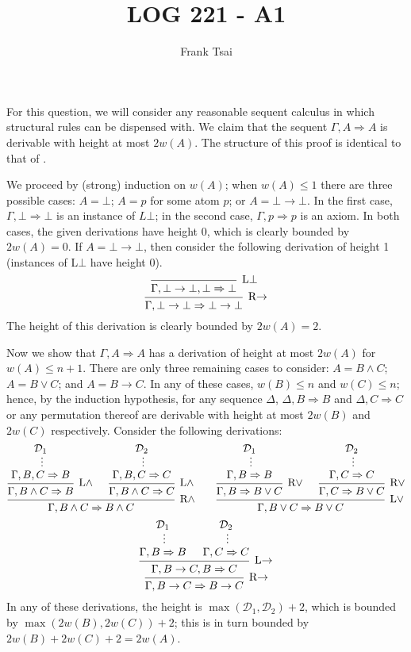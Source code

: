 \documentclass[a4paper]{article}
\title{LOG 221 - A1}
\author{Frank Tsai}
\newcommand{\seqarr}{\Rightarrow}
\newcommand{\cD}{\mathcal{D}}
\begin{document}
\maketitle

\section{}
For this question, we will consider any reasonable sequent calculus in which structural rules can be dispensed with.
We claim that the sequent $\Gamma,A \seqarr A$ is derivable with height at most $2w(A)$.
The structure of this proof is identical to that of \cite[Lemma 2.3.3]{Negri2001}.

We proceed by (strong) induction on $w(A)$; when $w(A) \leq 1$ there are three possible cases: $A = \bot$; $A = p$ for some atom $p$; or $A = \bot \to \bot$.
In the first case, $\Gamma,\bot \seqarr \bot$ is an instance of $L\bot$; in the second case, $\Gamma,p \seqarr p$ is an axiom.
In both cases, the given derivations have height $0$, which is clearly bounded by $2w(A) = 0$.
If $A = \bot \to \bot$, then consider the following derivation of height 1 (instances of L$\bot$ have height 0).
\[
  \begin{prooftree}
    \infer0[L$\bot$]{\Gamma,\bot \to \bot, \bot \seqarr \bot}
    \infer1[R$\to$]{\Gamma,\bot \to \bot \seqarr \bot \to \bot}
  \end{prooftree}
\]
The height of this derivation is clearly bounded by $2w(A) = 2$.

Now we show that $\Gamma,A \seqarr A$ has a derivation of height at most $2w(A)$ for $w(A) \leq n + 1$.
There are only three remaining cases to consider: $A = B \wedge C$; $A = B \vee C$; and $A = B \to C$.
In any of these cases, $w(B) \leq n$ and $w(C) \leq n$; hence, by the induction hypothesis, for any sequence $\Delta$, $\Delta,B \seqarr B$ and $\Delta,C \seqarr C$ or any permutation thereof are derivable with height at most $2w(B)$ and $2w(C)$ respectively.
Consider the following derivations:
\[
  \begin{prooftree}
    \hypo{\cD_1}
    \ellipsis{}{\Gamma,B,C \seqarr B}
    \infer1[L$\wedge$]{\Gamma,B \wedge C \seqarr B}
    \hypo{\cD_2}
    \ellipsis{}{\Gamma,B,C \seqarr C}
    \infer1[L$\wedge$]{\Gamma,B \wedge C \seqarr C}
    \infer2[R$\wedge$]{\Gamma,B \wedge C \seqarr B \wedge C}
  \end{prooftree}
  \qquad
  \begin{prooftree}
    \hypo{\cD_1}
    \ellipsis{}{\Gamma,B \seqarr B}
    \infer1[R$\vee$]{\Gamma,B \seqarr B \vee C}
    \hypo{\cD_2}
    \ellipsis{}{\Gamma,C \seqarr C}
    \infer1[R$\vee$]{\Gamma,C \seqarr B \vee C}
    \infer2[L$\vee$]{\Gamma,B \vee C \seqarr B \vee C}
  \end{prooftree}
\]
\[
  \begin{prooftree}
    \hypo{\cD_1}
    \ellipsis{}{\Gamma,B \seqarr B}
    \hypo{\cD_2}
    \ellipsis{}{\Gamma,C \seqarr C}
    \infer2[L$\to$]{\Gamma,B \to C, B \seqarr C}
    \infer1[R$\to$]{\Gamma,B \to C \seqarr B \to C}
  \end{prooftree}
\]
In any of these derivations, the height is $\max(\cD_1,\cD_2) + 2$, which is bounded by $\max(2w(B), 2w(C)) + 2$; this is in turn bounded by $2w(B) + 2w(C) + 2 = 2w(A)$.
\end{document}
